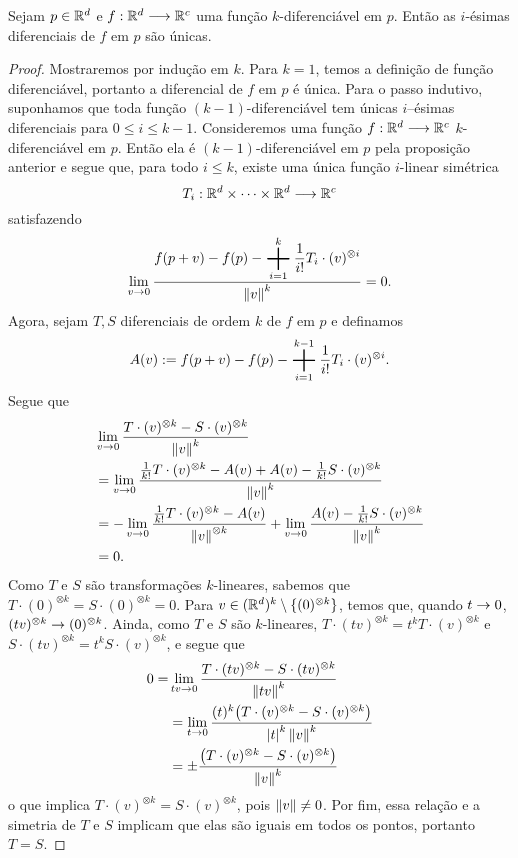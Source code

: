 \begin{prop}
Sejam $p \in \mathbb{R}^d$ e $f: \mathbb{R}^d \longrightarrow \mathbb{R}^c$ uma função $k$-diferenciável em $p$. Então as $i$-ésimas diferenciais de $f$ em $p$ são únicas.
\end{prop}
\begin{proof}
Mostraremos por indução em $k$. Para $k=1$, temos a definição de função diferenciável, portanto a diferencial de $f$ em $p$ é única. Para o passo indutivo, suponhamos que toda função $(k-1)$-diferenciável tem únicas $i$--ésimas diferenciais para $0\leq i \leq k-1$. Consideremos uma função $f: \mathbb{R}^d \longrightarrow \mathbb{R}^c$ $k$-diferenciável em $p$. Então ela é $(k-1)$-diferenciável em $p$ pela proposição anterior e segue que, para todo $i \leq k$, existe uma única função $i$-linear simétrica
	\begin{equation*}
	T_i: \mathbb{R}^d \times \cdots \times \mathbb{R}^d \longrightarrow \mathbb{R}^c
	\end{equation*}
satisfazendo
	\begin{equation*}
	\lim_{v \conv 0} \frac{\displaystyle f(p+v)-f(p)- \bigplus_{i=1}^k \frac{1}{i!}T_i \cdot (v)^{\otimes i}}{\nor{v}^k} = 0.
	\end{equation*}
Agora, sejam $T,S$ diferenciais de ordem $k$ de $f$ em $p$ e definamos
	\begin{equation*}
	A(v) := f(p+v)-f(p)- \bigplus_{i=1}^{k-1} \frac{1}{i!}T_i \cdot (v)^{\otimes i}.
	\end{equation*}
Segue que
	\begin{align*}
	&\lim_{v \rightarrow 0} \frac{T \cdot (v)^{\otimes k} - S \cdot (v)^{\otimes k}}{\left\Vert{v}\right\Vert^k} \\
	&= \lim_{v \rightarrow 0} \frac{\frac{1}{k!} T \cdot (v)^{\otimes k} - A(v) + A(v) - \frac{1}{k!} S \cdot (v)^{\otimes k}}{\left\Vert{v}\right\Vert^k} \\
	&= -\lim_{v \rightarrow 0} \frac{\frac{1}{k!} T \cdot (v)^{\otimes k} - A(v)}{\left\Vert{v}\right\Vert^{\otimes k}} + \lim_{v \rightarrow 0} \frac{A(v) - \frac{1}{k!} S \cdot (v)^{\otimes k}}{\left\Vert{v}\right\Vert^k} \\
	&= 0.
	\end{align*}
Como $T$ e $S$ são transformações $k$-lineares, sabemos que $T \cdot (0)^{\otimes k} = S \cdot (0)^{\otimes k} =0$. Para $v \in (\mathbb{R}^d)^k \setminus\{(0)^{\otimes k}\}$, temos que, quando $t \rightarrow 0$, $(tv)^{\otimes k} \rightarrow (0)^{\otimes k}$. Ainda, como $T$ e $S$ são $k$-lineares, $T \cdot (tv)^{\otimes k} = t^kT \cdot (v)^{\otimes k}$ e $S \cdot (tv)^{\otimes k} = t^kS \cdot (v)^{\otimes k}$, e segue que
	\begin{align*}
	0= &\lim_{tv \rightarrow 0} \frac{T \cdot (tv)^{\otimes k} -  S \cdot (tv)^{\otimes k}}{\left\Vert{tv}\right\Vert^k} \\
	&= \lim_{t \rightarrow 0} \frac{(t)^k\big(T \cdot (v)^{\otimes k} -  S \cdot (v)^{\otimes k}\big)}{\left\vert{t}\right\vert^k\left\Vert{v}\right\Vert^k} \\
	&= \pm \frac{\big(T \cdot (v)^{\otimes k} -  S \cdot (v)^{\otimes k}\big)}{\left\Vert{v}\right\Vert^k}
	\end{align*}
o que implica $T \cdot (v)^{\otimes k} =  S \cdot (v)^{\otimes k}$, pois $\left\Vert{v}\right\Vert \neq 0$. Por fim, essa relação e a simetria de $T$ e $S$ implicam que elas são iguais em todos os pontos, portanto $T=S$.
\end{proof}

